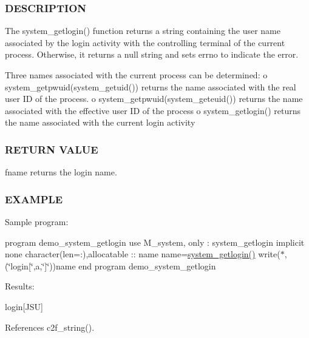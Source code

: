 \subsubsection*{D\+E\+S\+C\+R\+I\+P\+T\+I\+ON}

\begin{DoxyVerb}The system_getlogin() function returns a string containing the user
name associated by the login activity with the controlling terminal
of the current process.  Otherwise, it returns a null string and sets
errno to indicate the error.

Three names associated with the current process can be determined:
   o system_getpwuid(system_getuid()) returns the name associated with the real user ID of the process.
   o system_getpwuid(system_geteuid()) returns the  name  associated with  the  effective user ID of the process
   o system_getlogin() returns the name associated with the current login activity
\end{DoxyVerb}


\subsubsection*{R\+E\+T\+U\+RN V\+A\+L\+UE}

fname returns the login name.

\subsubsection*{E\+X\+A\+M\+P\+LE}

Sample program\+:

program demo\+\_\+system\+\_\+getlogin use M\+\_\+system, only \+: system\+\_\+getlogin implicit none character(len=\+:),allocatable \+:\+: name name=\hyperlink{namespacem__system_a70f78645a1f130734005e190d469529d}{system\+\_\+getlogin()} write($\ast$,\textquotesingle{}(\char`\"{}login\mbox{[}\char`\"{},a,\char`\"{}\mbox{]}\char`\"{})\textquotesingle{})name end program demo\+\_\+system\+\_\+getlogin

Results\+:

login\mbox{[}J\+SU\mbox{]} 

References c2f\+\_\+string().

\mbox{\label{namespacem__system_a59cd13de95dc9a65b444f02614ea39ce}} 
